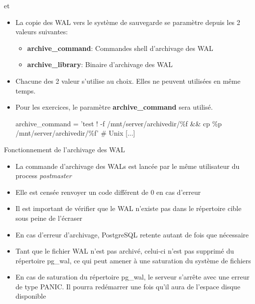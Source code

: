 \begin{frame}[fragile]{ et }

\begin{itemize}

   \item La copie des WAL vers le système de sauvegarde se paramètre depuis les 2 valeurs suivantes:

   \begin{itemize}
      \item \textbf{archive\_command}: Commandes shell d'archivage des WAL
      \item \textbf{archive\_library}: Binaire d'archivage des WAL
   \end{itemize}

   \item Chacune des 2 valeur s'utilise au choix. Elles ne peuvent utilisées en même temps.
   \item Pour les exercices, le paramètre \textbf{archive\_command} sera utilisé.

\begin{scriptsize}
   \begin{intercom}
archive\_command = 'test ! -f /mnt/server/archivedir/\%f && cp \%p /mnt/server/archivedir/\%f' # Unix
   [...]
   \end{intercom}
\end{scriptsize}

\end{itemize}

\end{frame}


\begin{frame}[fragile]{Fonctionnement de l'archivage des WAL}

\begin{itemize}

   \item La commande d'archivage des WALs est lancée par le même utilisateur du process \textit{postmaster}
   \item Elle est censée renvoyer un code différent de 0 en cas d'erreur
   \item Il est important de vérifier que le WAL n'existe pas dans le répertoire cible sous peine de l'écraser
   \item En cas d'erreur d'archivage, PostgreSQL retente autant de fois que nécessaire
   \item Tant que le fichier WAL n'est pas archivé, celui-ci n'est pas supprimé du répertoire pg\_wal, ce qui peut amener à une saturation du système de fichiers
   \item En cas de saturation du répertoire pg\_wal, le serveur s'arrête avec une erreur de type PANIC. Il pourra redémarrer une fois qu'il aura de l'espace disque disponible

\end{itemize}

\end{frame}

